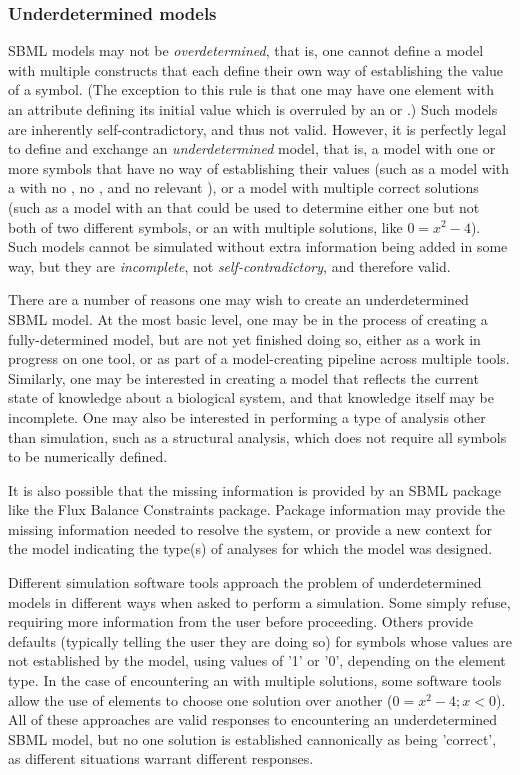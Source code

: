 \begin{blockChanged}
\subsubsection{Underdetermined models}
\label{sec:underdetermined}

SBML models may not be \emph{overdetermined}, that is, one cannot define a model with multiple constructs that each define their own way of establishing the value of a symbol.  (The exception to this rule is that one may have one element with an attribute defining its initial value which is overruled by an \InitialAssignment or \Rule.)  Such models are inherently self-contradictory, and thus not valid.  However, it is perfectly legal to define and exchange an \emph{underdetermined} model, that is, a model with one or more symbols that have no way of establishing their values (such as a model with a \Parameter with no , no \InitialAssignment, and no relevant \Rule), or a model with multiple correct solutions (such as a model with an \AlgebraicRule that could be used to determine either one but not both of two different symbols, or an \AlgebraicRule with multiple solutions, like $0=x^2-4$).  Such models cannot be simulated without extra information being added in some way, but they are \emph{incomplete}, not \emph{self-contradictory}, and therefore valid.

There are a number of reasons one may wish to create an underdetermined SBML model.  At the most basic level, one may be in the process of creating a fully-determined model, but are not yet finished doing so, either as a work in progress on one tool, or as part of a model-creating pipeline across multiple tools.  Similarly, one may be interested in creating a model that reflects the current state of knowledge about a biological system, and that knowledge itself may be incomplete.  One may also be interested in performing a type of analysis other than simulation, such as a structural analysis, which does not require all symbols to be numerically defined.

It is also possible that the missing information is provided by an SBML package like the Flux Balance Constraints package.  Package information may provide the missing information needed to resolve the system, or provide a new context for the model indicating the type(s) of analyses for which the model was designed.

Different simulation software tools approach the problem of underdetermined models in different ways when asked to perform a simulation.  Some simply refuse, requiring more information from the user before proceeding.  Others provide defaults (typically telling the user they are doing so) for symbols whose values are not established by the model, using values of '1' or '0', depending on the element type.  In the case of encountering an \AlgebraicRule with multiple solutions, some software tools allow the use of \Constraint elements to choose one solution over another ($0=x^2-4; x<0$).  All of these approaches are valid responses to encountering an underdetermined SBML model, but no one solution is established cannonically as being 'correct', as different situations warrant different responses.


\end{blockChanged}

